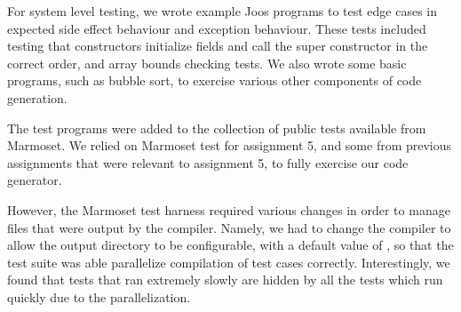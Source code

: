 \documentclass[pdftex,11pt,a4paper]{article}
\begin{document}
For system level testing, we wrote example Joos programs to test edge
cases in expected side effect behaviour and exception behaviour. These
tests included testing that constructors initialize fields and call the
super constructor in the correct order, and array bounds checking
tests. We also wrote some basic programs, such as bubble sort, to
exercise various other components of code generation.

The test programs were added to the collection of public tests
available from Marmoset. We relied on Marmoset test for assignment 5,
and some from previous assignments that were relevant to assignment 5,
to fully exercise our code generator.

However, the Marmoset test harness required various changes in order
to manage files that were output by the compiler. Namely, we had to
change the compiler to allow the output directory to be configurable,
with a default value of , so that the test suite was able
parallelize compilation of test cases correctly. Interestingly, we
found that tests that ran extremely slowly are hidden by all the tests
which run quickly due to the parallelization.
\end{document}

